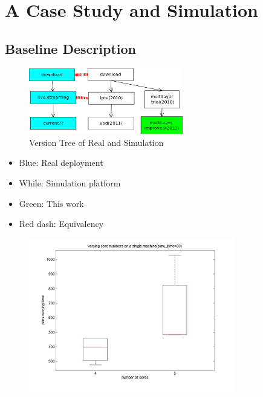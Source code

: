 \documentclass[11pt,a4paper]{article}
\begin{document}
\section{A Case Study and Simulation }

\subsection{Baseline Description}

\begin{figure}[htb]
	\centering
	\includegraphics[width=0.6\textwidth]{../fig/version_tree.png}
	\caption{Version Tree of Real and Simulation}
\end{figure}

\begin{itemize}
	\item Blue: Real deployment
	\item While: Simulation platform 
	\item Green: This work  
	\item Red dash: Equivalency
\end{itemize}

\begin{figure}
	\includegraphics[width=0.8\textwidth]{../fig/runtime_vs_core.jpg}
\end{figure}
\end{document}

